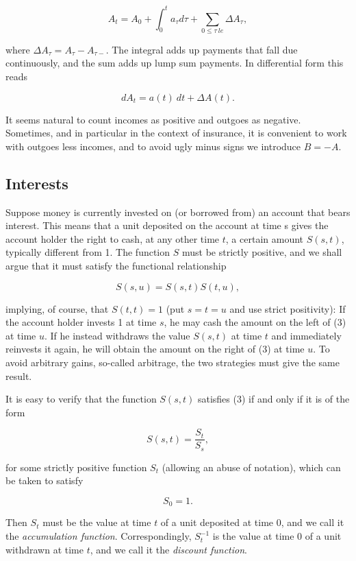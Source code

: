 \documentclass[a4paper,12pt,openany]{book}
\begin{document}
\[
A_t=A_0+\int_0^ta_\tau d\tau+\sum_{0\le \tau\ le}\Delta A_\tau,\tag{1}
\]

where \(\Delta A_\tau=A_\tau-A_{\tau-}\). The integral adds up payments that fall due continuously, and the sum adds up lump sum payments. In differential form this
reads

\[
dA_t=a(t)\ dt+\Delta A(t).\tag{2}
\]

It seems natural to count incomes as positive and outgoes as negative. Sometimes, and in particular in the context of insurance, it is convenient to work with outgoes less incomes, and to avoid ugly minus signs we introduce \(B = -A\).

\hypertarget{interests}{%
\subsection{Interests}\label{interests}}

Suppose money is currently invested on (or borrowed from) an account that bears interest. This means that a unit deposited on the account at time s gives the account holder the right to cash, at any other time \(t\), a certain amount \(S(s,t)\), typically different from 1. The function \(S\) must be strictly positive, and we shall argue that it must satisfy the functional relationship

\[
S(s, u) = S(s, t) S(t, u) ,\tag{3}
\]

implying, of course, that \(S(t,t) = 1\) (put \(s = t = u\) and use strict positivity): If the account holder invests 1 at time \(s\), he may cash the amount on the left of (3) at time \(u\). If he instead withdraws the value \(S(s,t)\) at time \(t\) and immediately reinvests it again, he will obtain the amount on the right of (3) at time \(u\). To avoid arbitrary gains, so-called arbitrage, the two strategies must give the same result.

It is easy to verify that the function \(S(s,t)\) satisfies (3) if and only if it is of the form

\[
S(s,t)=\frac{S_t}{S_s},\tag{4}
\]

for some strictly positive function \(S_t\) (allowing an abuse of notation), which can be taken to satisfy

\[
S_0=1.
\]

Then \(S_t\) must be the value at time \(t\) of a unit deposited at time 0, and we call it the \emph{accumulation function}. Correspondingly, \(S_t^{-1}\) is the value at time 0 of a unit withdrawn at time \(t\), and we call it the \emph{discount function}.
\end{document}
